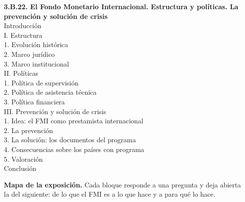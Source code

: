 \documentclass[11pt]{article}
\begin{document}
\begin{esquema}[unbreakable]
\textbf{3.B.22. El Fondo Monetario Internacional. Estructura y políticas. La prevención y solución de crisis}\\[2pt]
Introducción\\
I. Estructura\\
\hspace*{1.5em}1. Evolución histórica\\
\hspace*{1.5em}2. Marco jurídico\\
\hspace*{1.5em}3. Marco institucional\\
II. Políticas\\
\hspace*{1.5em}1. Política de supervisión\\
\hspace*{1.5em}2. Política de asistencia técnica\\
\hspace*{1.5em}3. Política financiera\\
III. Prevención y solución de crisis\\
\hspace*{1.5em}1. Idea: el FMI como prestamista internacional\\
\hspace*{1.5em}2. La prevención\\
\hspace*{1.5em}3. La solución: los documentos del programa\\
\hspace*{1.5em}4. Consecuencias sobre los países con programa\\
\hspace*{1.5em}5. Valoración\\
Conclusión
\end{esquema}

\begin{anotaciones}
\textbf{Mapa de la exposición.} Cada bloque responde a una pregunta y deja abierta la del siguiente: de lo que el FMI es a lo que hace y a para qué lo hace.
\begin{infografiacaja}
\caption{Mapa del tema: la pregunta de cada bloque y el hilo que los une}\label{figu:mapa-tema}
\end{infografiacaja}
\end{anotaciones}
\end{document}
